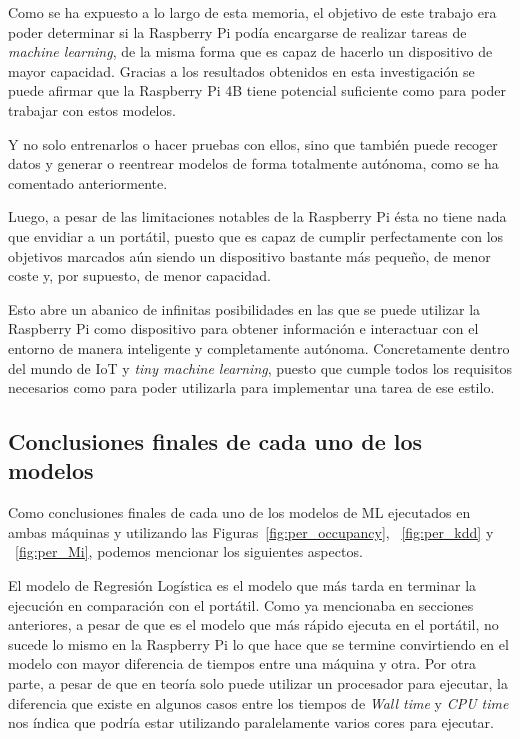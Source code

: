 \documentclass[a4paper, 12pt]{book}
\begin{document}
Como se ha expuesto a lo largo de esta memoria, el objetivo de este trabajo era poder determinar si la Raspberry Pi podía encargarse de realizar tareas de \textit{machine learning}, de la misma forma que es capaz de hacerlo un dispositivo de mayor capacidad. Gracias a los resultados obtenidos en esta investigación se puede afirmar que la Raspberry Pi 4B tiene potencial suficiente como para poder trabajar con estos modelos.

Y no solo entrenarlos o hacer pruebas con ellos, sino que también puede recoger datos y generar o reentrear modelos de forma totalmente autónoma, como se ha comentado anteriormente. 

Luego, a pesar de las limitaciones notables de la Raspberry Pi ésta no tiene nada que envidiar a un portátil, puesto que es capaz de cumplir perfectamente con los objetivos marcados aún siendo un dispositivo bastante más pequeño, de menor coste y, por supuesto, de menor capacidad.

Esto abre un abanico de infinitas posibilidades en las que se puede utilizar la Raspberry Pi como dispositivo para obtener información e interactuar con el entorno de manera inteligente y completamente autónoma. Concretamente dentro del mundo de IoT y \textit{tiny machine learning}, puesto que cumple todos los requisitos necesarios como para poder utilizarla para implementar una tarea de ese estilo.

\subsection{Conclusiones finales de cada uno de los modelos}

Como conclusiones finales de cada uno de los modelos de ML ejecutados en ambas máquinas y utilizando las Figuras~\ref{fig:per_occupancy}, ~\ref{fig:per_kdd} y ~\ref{fig:per_Mi}, podemos mencionar los siguientes aspectos.

El modelo de Regresión Logística es el modelo que más tarda en terminar la ejecución en comparación con el portátil. Como ya mencionaba en secciones anteriores, a pesar de que es el modelo que más rápido ejecuta en el portátil, no sucede lo mismo en la Raspberry Pi lo que hace que se termine convirtiendo en el modelo con mayor diferencia de tiempos entre una máquina y otra. Por otra parte, a pesar de que en teoría solo puede utilizar un procesador para ejecutar, la diferencia que existe en algunos casos entre los tiempos de \textit{Wall time} y \textit{CPU time} nos índica que podría estar utilizando paralelamente varios cores para ejecutar.
\end{document}
